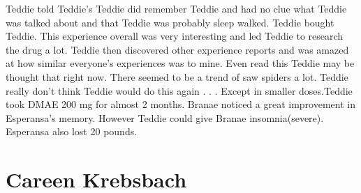 \documentclass[12pt]{book}
\begin{document}
Teddie told Teddie's Teddie did remember Teddie and had no clue what Teddie was talked about and that Teddie was probably sleep walked. Teddie bought Teddie. This experience overall was very interesting and led Teddie to research the drug a lot. Teddie then discovered other experience reports and was amazed at how similar everyone's experiences was to mine. Even read this Teddie may be thought that right now. There seemed to be a trend of saw spiders a lot. Teddie really don't think Teddie would do this again . . .  Except in smaller doses.Teddie took DMAE 200 mg for almost 2 months. Branae noticed a great improvement in Esperansa's memory. However Teddie could give Branae insomnia(severe). Esperansa also lost 20 pounds.



\chapter{Careen Krebsbach}
\end{document}
